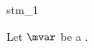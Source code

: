 \documentclass{stex}
\begin{document}
\begin{smodule}{stm_1}
  
  \begin{sassertion}[id=stm-1]
    Let $\mvar$ be a  .
  \end{sassertion}
\end{smodule}
\end{document}

